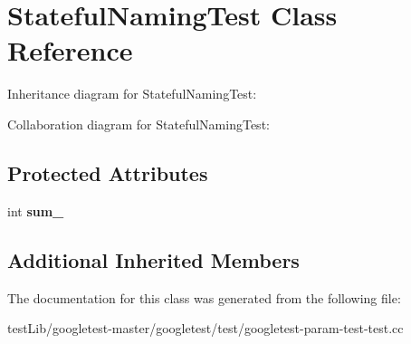 \hypertarget{classStatefulNamingTest}{}\section{Stateful\+Naming\+Test Class Reference}
\label{classStatefulNamingTest}


Inheritance diagram for Stateful\+Naming\+Test\+:


Collaboration diagram for Stateful\+Naming\+Test\+:
\subsection*{Protected Attributes}
\begin{DoxyCompactItemize}
\item 
\mbox{\label{classStatefulNamingTest_ad719a1c2919c304bfe840313142a376a}} 
int {\bfseries sum\+\_\+}
\end{DoxyCompactItemize}
\subsection*{Additional Inherited Members}


The documentation for this class was generated from the following file\+:\begin{DoxyCompactItemize}
\item 
test\+Lib/googletest-\/master/googletest/test/googletest-\/param-\/test-\/test.\+cc\end{DoxyCompactItemize}
